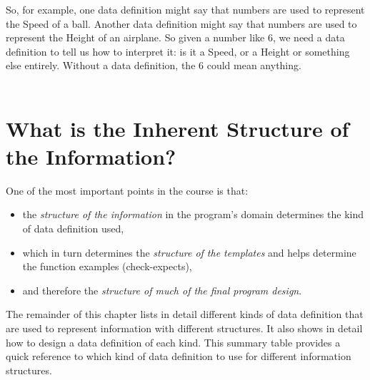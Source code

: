 \documentclass[11pt,a4paper]{report}
\begin{document}
	So, for example, one data definition might say that numbers are used to represent the Speed of a
	 ball. Another data definition might say that numbers are used to represent the Height of an 
	 airplane. So given a number like 6, we need a data definition to tell us how to interpret it:
	 is it a Speed, or a Height or something else entirely. Without a data definition, the 6 could
	 mean anything.
	\\ \\
	\pagebreak
	\section{What is the Inherent Structure of the Information?}
	One of the most important points in the course is that:
	\begin{itemize}
		\item the \emph{structure of the information} in the program's domain determines the kind of data definition used,
		\item which in turn determines the \emph{structure of the templates} and helps determine the function examples (check-expects),
		\item and therefore the \emph{structure of much of the final program design}.
	\end{itemize}

	The remainder of this chapter lists in detail different kinds of data definition that are used to
	represent information with different structures. It also shows in detail how to design a
	data definition of each kind. This summary table provides a quick reference to which kind of data
	definition to use for different information structures.
	
\end{document}
